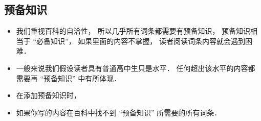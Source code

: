
\subsection{预备知识}
\begin{itemize}
\item 我们重视百科的自洽性， 所以几乎所有词条都需要有预备知识， 预备知识相当于 “必备知识”， 如果里面的内容不掌握， 读者阅读词条内容就会遇到困难．
\item 一般来说我们假设读者具有普通高中生只是水平． 任何超出该水平的内容都需要再 “预备知识” 中有所体现．
\item 在添加预备知识时， 
\item 如果你写的内容在百科中找不到 “预备知识” 所需要的所有词条．
\end{itemize}

